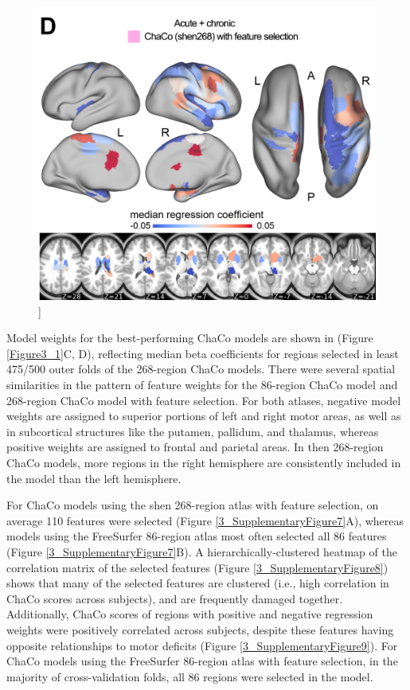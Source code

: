 \documentclass[phd,tocprelim]{cornell}
\renewcommand{\caption}[1]{\singlespacing\hangcaption{#1}\normalspacing}
\begin{document}
\null
\vfill
\clearpage
\null
\vfill
\begin{figure}[h!]
		\ContinuedFloat
		\captionsetup{labelformat=adja-page}
    \centering
    \includegraphics[width=1\textwidth]{chapter3/Figure1D.png}
    \caption[]{}
\end{figure}
\null
\vfill



Model weights for the best-performing ChaCo models are shown in (Figure \ref{Figure3_1}C, D), reflecting median beta coefficients for regions selected in least 475/500 outer folds of the 268-region ChaCo models. There were several spatial similarities in the pattern of feature weights for the 86-region ChaCo model and 268-region ChaCo model with feature selection. For both atlases, negative model weights are assigned to superior portions of left and right motor areas, as well as in subcortical structures like the putamen, pallidum, and thalamus, whereas positive weights are assigned to frontal and parietal areas. In then 268-region ChaCo models, more regions in the right hemisphere are consistently included in the model than the left hemisphere. 


For ChaCo models using the shen 268-region atlas with feature selection, on average 110 features were selected (Figure \ref{3_SupplementaryFigure7}A), whereas models using the FreeSurfer 86-region atlas most often selected all 86 features (Figure \ref{3_SupplementaryFigure7}B).  A hierarchically-clustered heatmap of the correlation matrix of the selected features (Figure \ref{3_SupplementaryFigure8}) shows that many of the selected features are clustered (i.e., high correlation in ChaCo scores across subjects), and are frequently damaged together. Additionally, ChaCo scores of regions with positive and negative regression weights were positively correlated across subjects, despite these features having opposite relationships to motor deficits (Figure \ref{3_SupplementaryFigure9}). For ChaCo models using the FreeSurfer 86-region atlas with feature selection, in the majority of cross-validation folds, all 86 regions were selected in the model. 
\end{document}
